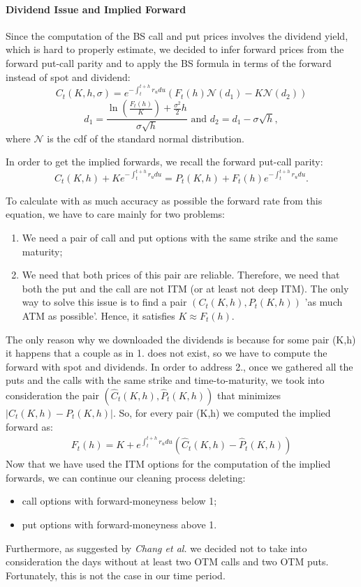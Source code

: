 \paragraph{Dividend Issue and Implied Forward}
Since the computation of the BS call and put prices involves the dividend yield, which is hard to properly estimate, we decided to infer forward prices from the forward put-call parity and to apply the BS formula in terms of the forward instead of spot and dividend: 
\begin{equation}
C_t(K,h,\sigma)=e^{-\int_{t}^{t+h} r_u  du} (F_t(h) \mathcal{N}(d_1)-K\mathcal{N}(d_2))
\end{equation}
\begin{equation}
d_1=\frac{\ln(\frac{F_t(h)}{K})+\frac{\sigma^2}{2}h}{\sigma \sqrt{h}}\text{  and  } d_2 = d_1-\sigma \sqrt{h},
\end{equation}
where $\mathcal{N}$ is the cdf of the standard normal distribution.

\vspace{4mm}
In order to get the implied forwards, we recall the forward put-call parity:
\begin{equation}
 C_t(K,h)+K e^{-\int_{t}^{t+h} r_u du} = P_t(K,h) + F_t(h) e^{-\int_{t}^{t+h} r_u du}.
\end{equation}

To calculate with as much accuracy as possible the forward rate from this equation, we have to care mainly for two problems:
\begin{enumerate}
    \item We need a pair of call and put options with the same strike and the same maturity;
    \item We need that both prices of this pair are reliable. Therefore, we need that both the put and the call are not ITM (or at least not deep ITM). The only way to solve this issue is to find a pair  $(C_t(K,h),P_t(K,h))$ 'as much ATM as possible'. Hence, it satisfies $K\approx F_t(h)$.
\end{enumerate}
The only reason why we downloaded the dividends is because for some pair (K,h) it happens that a couple as in 1. does not exist, so we have to compute the forward with spot and dividends. In order to address 2., once we gathered all the puts and the calls with the same strike and time-to-maturity, we took into consideration the pair $(\hat{C}_t(K,h),\hat{P}_t(K,h))$ that minimizes $|C_t(K,h)-P_t(K,h)|$. So, for every pair (K,h) we computed the implied forward as:
\begin{align*}
    F_t(h)=K+ e^{\int_{t}^{t+h} r_u  du} (\hat{C}_t(K,h)-\hat{P}_t(K,h))
\end{align*}
Now that we have used the ITM options for the computation of the implied forwards, we can continue our cleaning process deleting:
\begin{itemize}
\item call options with forward-moneyness below 1;
\item put options with forward-moneyness above 1.
\end{itemize}
Furthermore, as suggested by \textit{Chang et al.} we decided not to take into consideration the days without at least two OTM calls and two OTM puts. Fortunately, this is not the case in our time period.

